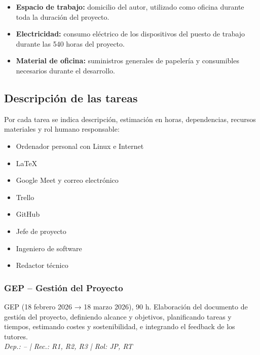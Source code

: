 \documentclass{article}
\begin{document}
{        \begin{itemize}[leftmargin=*, itemsep=1pt]
        \item \textbf{Espacio de trabajo:} domicilio del autor, utilizado como oficina 
        durante toda la duración del proyecto.
        \item \textbf{Electricidad:} consumo eléctrico de los dispositivos del puesto 
        de trabajo durante las 540 horas del proyecto.
        \item \textbf{Material de oficina:} suministros generales de papelería y 
        consumibles necesarios durante el desarrollo.
        \end{itemize}
    \par

    \subsection{Descripción de las tareas}
        \setlength{\parskip}{1em}
    
        \justify
        Por cada tarea se indica descripción, estimación en horas, dependencias, recursos 
        materiales y rol humano responsable:
    
        \begin{itemize}[leftmargin=2em, itemsep=1pt, topsep=1pt]
        \item[R1] Ordenador personal con Linux e Internet
        \item[R2] \LaTeX{}
        \item[R3] Google Meet y correo electrónico
        \item[R4] Trello
        \item[R5] GitHub
        \end{itemize}

        \begin{itemize}[leftmargin=2em, itemsep=1pt, topsep=1pt]
        \item[JP] Jefe de proyecto
        \item[IS] Ingeniero de software
        \item[RT] Redactor técnico
        \end{itemize}


        \subsubsection{GEP – Gestión del Proyecto}
        \justify
        GEP (18 febrero 2026 → 18 marzo 2026), 90 h. 
        Elaboración del documento de gestión del proyecto, definiendo alcance y objetivos, 
        planificando tareas y tiempos, estimando costes y sostenibilidad, e integrando el 
        feedback de los tutores. \\
        \textit{Dep.: -- | Rec.: R1, R2, R3 | Rol: JP, RT}


}
\end{document}
